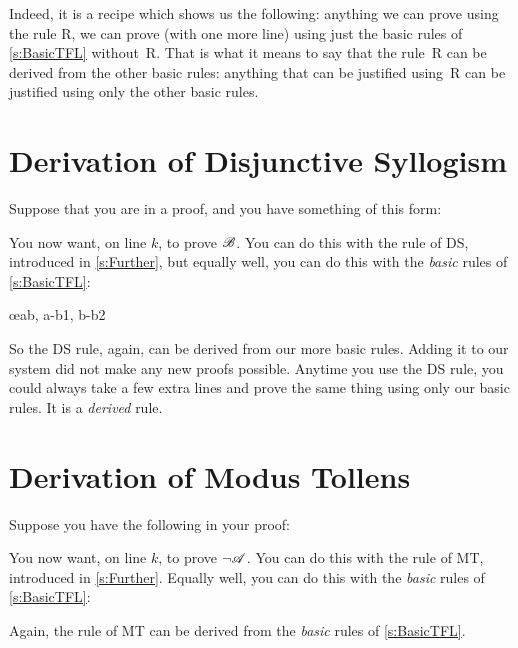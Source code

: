 Indeed, it is a recipe which shows us the following: anything we can prove using the rule R, we can prove (with one more line) using just the basic rules of \cref{s:BasicTFL} without~R. That is what it means to say that the rule~R can be derived from the other basic rules: anything that can be justified using~R can be justified using only the other basic rules.


\section{Derivation of Disjunctive Syllogism}
Suppose that you are in a proof, and you have something of this form:
\begin{fitchproof}
\end{fitchproof}
You now want, on line $k$, to prove $\mathscr{B}$. You can do this with the rule of DS, introduced in \cref{s:Further}, but equally well, you can do this with the \emph{basic} rules of \cref{s:BasicTFL}:
	\begin{fitchproof}
		\open
			\AS
		\close
		\open
			\AS
		\close
	\oe{ab, a-b1, b-b2}
\end{fitchproof}
So the DS rule, again, can be derived from our more basic rules. Adding it to our system did not make any new proofs possible. Anytime you use the DS rule, you could always take a few extra lines and prove the same thing using only our basic rules. It is a \emph{derived} rule.

\section{Derivation of Modus Tollens}
Suppose you have the following in your proof:
\begin{fitchproof}
\end{fitchproof}
You now want, on line $k$, to prove $\neg \mathscr{A}$. You can do this with the rule of MT, introduced in \cref{s:Further}. Equally well, you can do this with the \emph{basic} rules of \cref{s:BasicTFL}:
\begin{fitchproof}
		\open
		\AS
		\close
\end{fitchproof}
Again, the rule of MT can be derived from the \emph{basic} rules of \cref{s:BasicTFL}.

